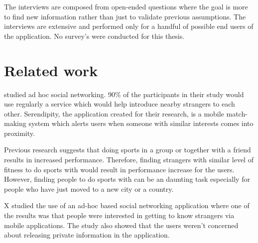 The interviews are composed from open-ended questions where the goal is more to find new information rather than just to validate previous assumptions. The interviews are extensive and performed only for a handful of possible end users of the application. No survey's were conducted for this thesis.

\section{Related work}

\cite{socialAdHoc} studied ad hoc social networking. 90\% of the participants in their study would use regularly a service which would help introduce nearby strangers to each other. Serendipity, the application created for their research, is a mobile match-making system which alerts users when someone with similar interests comes into proximity.

Previous research suggests that doing sports in a group or together with a friend results in increased performance. Therefore, finding strangers with similar level of fitness to do sports with would result in performance increase for the users. However, finding people to do sports with can be an daunting task especially for people who have just moved to a new city or a country.

X studied the use of an  ad-hoc based social networking application where one of the results was that people were interested in getting to know strangers via mobile applications. The study also showed that the users weren't concerned about releasing private information in the application.


